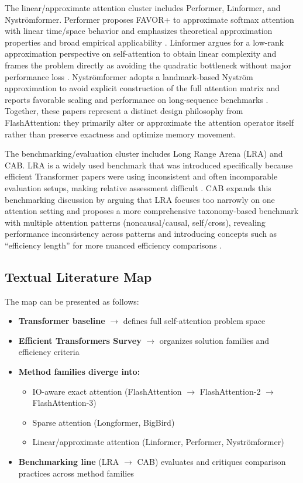 \documentclass[12pt, a4paper]{article}
\begin{document}
The linear/approximate attention cluster includes Performer, Linformer, and Nystr\"{o}mformer. Performer proposes FAVOR+ to approximate softmax attention with linear time/space behavior and emphasizes theoretical approximation properties and broad empirical applicability \parencite{choromanski2022rethinkingattentionperformers}. Linformer argues for a low-rank approximation perspective on self-attention to obtain linear complexity and frames the problem directly as avoiding the quadratic bottleneck without major performance loss \parencite{wang2020linformerselfattentionlinearcomplexity}. Nystr\"{o}mformer adopts a landmark-based Nystr\"{o}m approximation to avoid explicit construction of the full attention matrix and reports favorable scaling and performance on long-sequence benchmarks \parencite{xiong2021nystromformernystrombasedalgorithmapproximating}. Together, these papers represent a distinct design philosophy from FlashAttention: they primarily alter or approximate the attention operator itself rather than preserve exactness and optimize memory movement.

The benchmarking/evaluation cluster includes Long Range Arena (LRA) and CAB. LRA is a widely used benchmark that was introduced specifically because efficient Transformer papers were using inconsistent and often incomparable evaluation setups, making relative assessment difficult \parencite{tay2020longrangearenabenchmark}. CAB expands this benchmarking discussion by arguing that LRA focuses too narrowly on one attention setting and proposes a more comprehensive taxonomy-based benchmark with multiple attention patterns (noncausal/causal, self/cross), revealing performance inconsistency across patterns and introducing concepts such as ``efficiency length'' for more nuanced efficiency comparisons \parencite{zhang2025cabcomprehensiveattentionbenchmarking}.

\subsection{Textual Literature Map}

The map can be presented as follows:
\begin{itemize}
    \item \textbf{Transformer baseline} $\rightarrow$ defines full self-attention problem space
    \item \textbf{Efficient Transformers Survey} $\rightarrow$ organizes solution families and efficiency criteria
    \item \textbf{Method families diverge into:}
    \begin{itemize}
        \item IO-aware exact attention (FlashAttention $\rightarrow$ FlashAttention-2 $\rightarrow$ FlashAttention-3)
        \item Sparse attention (Longformer, BigBird)
        \item Linear/approximate attention (Linformer, Performer, Nystr\"{o}mformer)
    \end{itemize}
    \item \textbf{Benchmarking line} (LRA $\rightarrow$ CAB) evaluates and critiques comparison practices across method families
\end{itemize}
\end{document}
